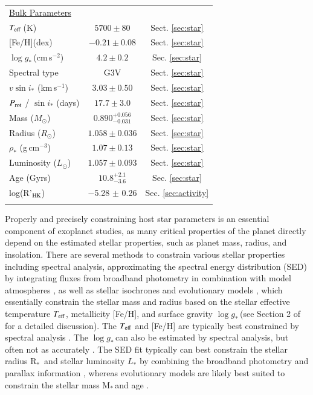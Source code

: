 \documentclass{aa}
\newcommand{\feh}{\mbox{[Fe/H]}\xspace}
\newcommand{\teff}{\ensuremath{T_{\rm eff}}\xspace}
\newcommand{\logg}{\mbox{$\log g_*$}\,}
\newcommand{\mstar}{\mbox{M$_{*}$}}
\newcommand{\rstar}{\mbox{R$_{*}$}}
\newcommand{\lstar}{\mbox{$L_{*}$}\xspace}
\begin{document}
\begin{table}
{\begin{tabular}{lcc}
    
  \multicolumn{3}{l}{\underline{Bulk Parameters}}\\
    \noalign{\smallskip}
    \noalign{\smallskip}
    \teff\,(K) & $5700\pm80$   & Sect. \ref{sec:star}\\
    \feh (dex) & $-0.21\pm0.08$ & Sect. \ref{sec:star}\\
    \logg (cm\,s$^{-2}$) & $4.2\pm0.2$   & Sec. \ref{sec:star}\\
    Spectral type & G3V & Sect. \ref{sec:star}\\
	$v \sin i_{*}$ (km\,s$^{-1}$) & $3.03 \pm 0.50$ 	& Sect. \ref{sec:star}\\
	$P_{\rm rot}$ / $\sin i_{*}$ (days) & $17.7 \pm 3.0$	& Sect. \ref{sec:star} \\
    Mass ($M_{\odot}$) & $0.890^{+0.056}_{-0.031}$  & Sect. \ref{sec:star} \\
    Radius ($R_{\odot}$) & $1.058\pm0.036$  & Sect. \ref{sec:star} \\
    $\rho_*$ (g\,cm$^{-3}$) & $1.07\pm0.13$  & Sect. \ref{sec:star}\\
    Luminosity ($L_{\odot}$) & $1.057\pm0.093$  & Sect. \ref{sec:star} \\
	Age	(Gyrs) & $10.8^{+2.1}_{-3.6}$ & Sec. \ref{sec:star} \\
	log(R'$_{\rm{HK}}$) & $-$5.28 $\pm$ 0.26 & Sec. \ref{sec:activity} \\
 	\noalign{\smallskip}
	\hline
 	\noalign{\smallskip}
    \end{tabular}}

 \label{tab:star_table}
\end{table}   

Properly and precisely constraining host star parameters is an essential component of exoplanet studies, as many critical properties of the planet directly depend on the estimated stellar properties, such as planet mass, radius, and insolation. There are several methods to constrain various stellar properties including spectral analysis, approximating the spectral energy distribution (SED) by integrating fluxes from broadband photometry in combination with model atmospheres \citep[e.g.,][]{vanBelle2009,StassunTorres2016}, as well as stellar isochrones and evolutionary models \citep{Yi2001,Dotter2016}, which essentially constrain the stellar mass and radius based on the stellar effective temperature \teff, metallicity \feh, and surface gravity \logg (see Section 2 of \citet{Eastman2019} for a detailed discussion). The \teff and \feh are typically best constrained by spectral analysis \citep[e.g.,][]{Stassun2017,Jofre2019}. The \logg can also be estimated by spectral analysis, but often not as accurately \citep[e.g.,][]{Torres2012}. The SED fit typically can best constrain the stellar radius \rstar\, and stellar luminosity \lstar by combining the broadband photometry and parallax information \citep[e.g.,][]{StassunTorres2016}, whereas evolutionary models are likely best suited to constrain the stellar mass \mstar\,and age \citep{Tayar2022}.
\end{document}
